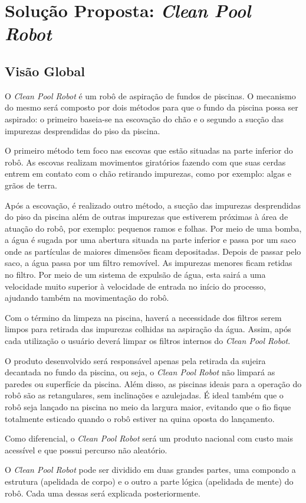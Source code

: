 \chapter{Solução Proposta: \textit{Clean Pool Robot}}
\section{Visão Global}
O \textit{Clean Pool Robot} é um robô de aspiração de fundos de piscinas. O
mecanismo do mesmo será composto por dois métodos para que o fundo da piscina
possa ser aspirado: o primeiro baseia-se na escovação do chão e o segundo a
sucção das impurezas desprendidas do piso da piscina.
\par
O primeiro método tem foco nas escovas que estão situadas na parte inferior
do robô. As escovas realizam movimentos giratórios fazendo com que suas cerdas
entrem em contato com o chão retirando  impurezas, como por exemplo: algas e
grãos de terra.
\par
Após a escovação, é realizado outro método, a sucção das impurezas desprendidas
do piso da piscina  além de outras impurezas que estiverem próximas à área de
atuação do robô, por exemplo: pequenos ramos e folhas. Por meio de uma bomba, a
água é sugada por uma abertura situada na parte inferior e passa por um saco onde
as partículas de maiores dimensões ficam depositadas. Depois de passar pelo saco,
a água passa por um filtro removível. As impurezas menores ficam retidas no filtro.
Por meio de um sistema de expulsão de água, esta sairá a uma velocidade muito superior
à velocidade de entrada no início do processo, ajudando também na movimentação do robô.
\par
Com o término da limpeza na piscina, haverá a necessidade dos filtros serem limpos
para retirada das impurezas colhidas na aspiração da água. Assim, após cada utilização
o usuário deverá limpar os filtros internos do \textit{Clean Pool Robot}.
\par
O produto desenvolvido será responsável apenas pela retirada da sujeira decantada
no fundo da piscina, ou seja, o \textit{Clean Pool Robot} não limpará as paredes
ou superfície da piscina. Além disso, as piscinas ideais para a operação do robô
são as retangulares, sem inclinações e azulejadas. É ideal também que o robô seja
lançado na piscina no meio da largura maior, evitando que o fio fique totalmente
esticado quando o robô estiver na quina oposta do lançamento.
\par
Como diferencial, o \textit{Clean Pool Robot} será um produto nacional com custo
mais acessível e que possui percurso não aleatório.
\par
O \textit{Clean Pool Robot} pode ser dividido em duas grandes partes, uma compondo a
estrutura (apelidada de corpo) e o outro a parte lógica (apelidada de mente) do
robô. Cada uma dessas será explicada posteriormente.

